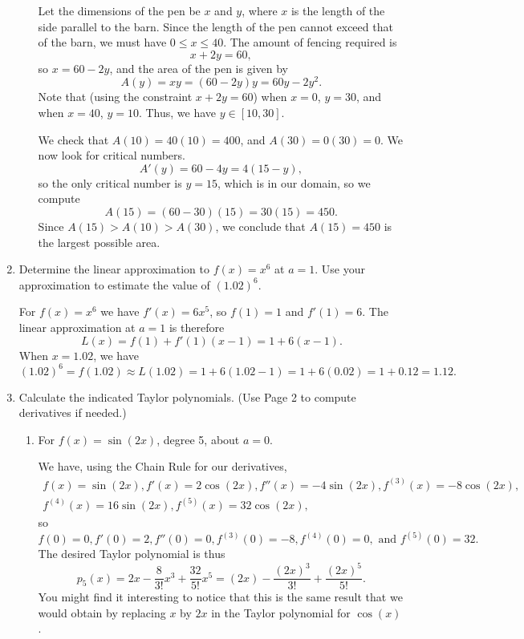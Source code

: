 \documentclass[12pt]{article}
\begin{document}
\begin{enumerate}
\begin{enumerate}
 \medskip
 
Let the dimensions of the pen be $x$ and $y$, where $x$ is the length of the side parallel to the barn. Since the length of the pen cannot exceed that of the barn, we must have $0\leq x\leq 40$. The amount of fencing required is
\[
x+2y = 60,
\]
so $x=60-2y$, and the area of the pen is given by
\[
A(y) = xy = (60-2y)y = 60y-2y^2.
\]
Note that (using the constraint $x+2y=60$) when $x=0$, $y=30$, and when $x=40$, $y=10$. Thus, we have $y\in [10,30]$.

We check that $A(10) = 40(10)=400$, and $A(30) = 0(30)=0$. We now look for critical numbers.
\[
A'(y) = 60-4y=4(15-y),
\]
so the only critical number is $y=15$, which is in our domain, so we compute
\[
A(15) = (60-30)(15)=30(15)=450.
\]
Since $A(15)>A(10)>A(30)$, we conclude that $A(15)=450$ is the largest possible area.
 \end{enumerate}
 
 \newpage
 
 
 \item Determine the linear approximation to $f(x)=x^6$ at $a=1$. Use your approximation to estimate the value of $(1.02)^6$. 
 
 \medskip
 
 For $f(x)=x^6$ we have $f'(x)=6x^5$, so $f(1)=1$ and $f'(1)=6$. The linear approximation at $a=1$ is therefore
 \[
 L(x) = f(1)+f'(1)(x-1) = 1+6(x-1).
 \]
 When $x=1.02$, we have
 \[
 (1.02)^6 = f(1.02)\approx L(1.02) = 1+6(1.02-1)=1+6(0.02) = 1+0.12=1.12.
 \]
 
 \medskip
 
 \item Calculate the indicated Taylor polynomials. (Use Page 2 to compute derivatives if needed.)
 \begin{enumerate}
 \item For $f(x)= \sin(2x)$, degree 5, about $a=0$. 
 \medskip
 
 We have, using the Chain Rule for our derivatives,
 \begin{multline*}
 f(x)=\sin(2x), f'(x) = 2\cos(2x), f''(x) = -4\sin(2x), f^{(3)}(x) = -8\cos(2x),\\ f^{(4)}(x) = 16\sin(2x), f^{(5)}(x) = 32\cos(2x),
 \end{multline*}
 so
 \[
 f(0)=0, f'(0)=2, f''(0) = 0, f^{(3)}(0) = -8, f^{(4)}(0)=0, \text{ and } f^{(5)}(0) = 32.
 \]
 The desired Taylor polynomial is thus
 \[
 p_5(x) = 2x-\frac{8}{3!}x^3 +\frac{32}{5!}x^5 = (2x)-\frac{(2x)^3}{3!}+\frac{(2x)^5}{5!}.
 \]
 You might find it interesting to notice that this is the same result that we would obtain by replacing $x$ by $2x$ in the Taylor polynomial for $\cos(x)$.
 

\end{enumerate}
\end{enumerate}
\end{document}

